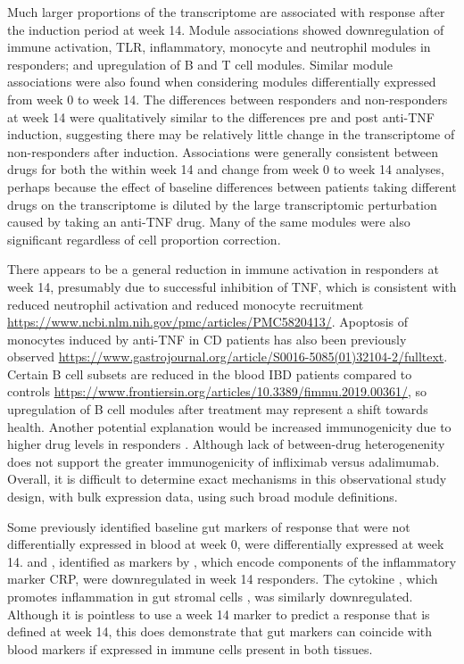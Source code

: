 Much larger proportions of the transcriptome are associated with response after the induction period at week 14.
Module associations
showed downregulation of immune activation, \gls{TLR}, inflammatory, monocyte and neutrophil modules in responders;
and upregulation of B and T cell modules.
Similar module associations were also found when considering modules differentially expressed from week 0 to week 14.
The differences between responders and non-responders at week 14 
were qualitatively similar to the differences pre and post anti-\gls{TNF} induction,
suggesting there may be relatively little change in the transcriptome of non-responders after induction.
Associations were generally consistent between drugs for both the within week 14 and change from week 0 to week 14 analyses,
perhaps because the effect of baseline differences between patients taking different drugs on the transcriptome is diluted
by the large transcriptomic perturbation caused by taking an anti-\gls{TNF} drug.
Many of the same modules were also significant regardless of cell proportion correction.

There appears to be a general reduction in immune activation in responders at week 14,
presumably due to successful inhibition of \gls{TNF},
which is consistent with reduced neutrophil activation and reduced monocyte recruitment \url{https://www.ncbi.nlm.nih.gov/pmc/articles/PMC5820413/}.
Apoptosis of monocytes induced by anti-\gls{TNF} in \gls{CD} patients has also been previously observed \url{https://www.gastrojournal.org/article/S0016-5085(01)32104-2/fulltext}.
Certain B cell subsets are reduced in the blood \gls{IBD} patients compared to controls \url{https://www.frontiersin.org/articles/10.3389/fimmu.2019.00361/}, 
so upregulation of B cell modules after treatment may represent a shift towards health.
Another potential explanation would be increased immunogenicity due to higher drug levels in responders \autocite{kennedy2019PredictorsAntiTNFTreatment}.
Although lack of between-drug heterogenenity does not support the greater immunogenicity of infliximab versus adalimumab.
Overall, it is difficult to determine exact mechanisms in this observational study design, with bulk expression data, using such broad module definitions.

Some previously identified baseline gut markers of response that were not differentially expressed in blood at week 0, were differentially expressed at week 14.
 and , identified as markers by \textcite{arijs2010PredictiveValueEpithelial}, which encode components of the inflammatory marker \gls{CRP}, were downregulated in week 14 responders.
The cytokine , which promotes inflammation in gut stromal cells \autocite{west2017OncostatinDrivesIntestinal}, was similarly downregulated.
Although it is pointless to use a week 14 marker to predict a response that is defined at week 14,
this does demonstrate that gut markers can coincide with blood markers if expressed in immune cells present in both tissues.

